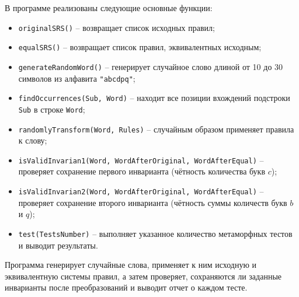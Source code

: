 \documentclass[a4paper,12pt]{article}
\begin{document}
В программе реализованы следующие основные функции:

\begin{itemize}[parsep=-1pt]
    \item \verb|originalSRS()| – возвращает список исходных правил;
    \item \verb|equalSRS()| – возвращает список правил, эквивалентных исходным;
    \item \verb|generateRandomWord()| – генерирует случайное слово длиной от 10 до 30 символов из алфавита \verb|"abcdpq"|;
    \item \verb|findOccurrences(Sub, Word)| – находит все позиции вхождений подстроки \verb|Sub| в строке \verb|Word|;
    \item \verb|randomlyTransform(Word, Rules)| – случайным образом применяет правила к слову;
    \item \verb|isValidInvarian1(Word, WordAfterOriginal, WordAfterEqual)| – проверяет сохранение первого инварианта (чётность количества букв $c$);
    \item \verb|isValidInvarian2(Word, WordAfterOriginal, WordAfterEqual)| – проверяет сохранение второго инварианта (чётность суммы количеств букв $b$ и $q$);
    \item \verb|test(TestsNumber)| – выполняет указанное количество метаморфных тестов и выводит результаты.
\end{itemize}

Программа генерирует случайные слова, применяет к ним исходную и эквивалентную системы правил, а затем проверяет, сохраняются ли заданные инварианты после преобразований и выводит отчет о каждом тесте.
\end{document}
